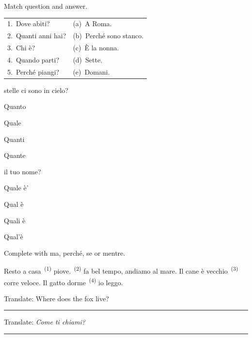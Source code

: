 \documentclass[11pt,a4paper,twoside,openright]{book}
\newcommand{\blank}{\underline{\hspace{2.6cm}}}
\newcommand{\clozeblank}[1]{\underline{\hspace{2.4cm}}\textsuperscript{\,(#1)}}
\newcommand{\answerline}{\par\vspace{6pt}\noindent\rule{0.75\linewidth}{0.4pt}\par}
\begin{document}
\begin{exercises}
\item\label{ex:question-words-conjunctions-1}\relax Match question and answer.\par\smallskip\begin{tabularx}{\linewidth}{@{}L L@{}}
1.\ Dove abiti? & (a)\ A Roma. \\
2.\ Quanti anni hai? & (b)\ Perché sono stanco. \\
3.\ Chi è? & (c)\ È la nonna. \\
4.\ Quando parti? & (d)\ Sette. \\
5.\ Perché piangi? & (e)\ Domani. \\
\end{tabularx}
\item\label{ex:question-words-conjunctions-2}\relax \blank{} stelle ci sono in cielo?\par\nopagebreak\begin{options}
\item\relax Quanto
\item\relax Quale
\item\relax Quanti
\item\relax Quante
\end{options}
\item\label{ex:question-words-conjunctions-3}\relax \blank{} il tuo nome?\par\nopagebreak\begin{options}
\item\relax Quale è'
\item\relax Qual è
\item\relax Quali è
\item\relax Qual'è
\end{options}
\item\label{ex:question-words-conjunctions-4}\relax Complete with ma, perché, se or mentre.\par\smallskip\begingroup\setlength{\parindent}{0pt}Resto a casa \clozeblank{1} piove. \clozeblank{2} fa bel tempo, andiamo al mare. Il cane è vecchio \clozeblank{3} corre veloce. Il gatto dorme \clozeblank{4} io leggo.\par\endgroup
\item\label{ex:question-words-conjunctions-5}\relax Translate: Where does the fox live?\par\answerline
\item\label{ex:question-words-conjunctions-6}\relax Translate: \textit{Come ti chiami?}\par\answerline
\end{exercises}
\end{document}
